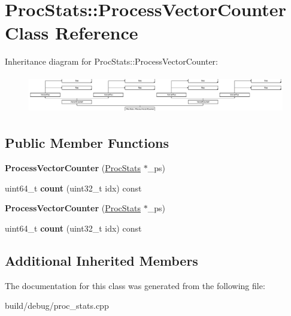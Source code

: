 \hypertarget{classProcStats_1_1ProcessVectorCounter}{\section{Proc\-Stats\-:\-:Process\-Vector\-Counter Class Reference}
\label{classProcStats_1_1ProcessVectorCounter}
}
Inheritance diagram for Proc\-Stats\-:\-:Process\-Vector\-Counter\-:\begin{figure}[H]
\begin{center}
\leavevmode
\includegraphics[height=1.674641cm]{classProcStats_1_1ProcessVectorCounter}
\end{center}
\end{figure}
\subsection*{Public Member Functions}
\begin{DoxyCompactItemize}
\item 
\hypertarget{classProcStats_1_1ProcessVectorCounter_aaa84227ea2ba5b9797c6fd18c3277914}{{\bfseries Process\-Vector\-Counter} (\hyperlink{classProcStats}{Proc\-Stats} $\ast$\-\_\-ps)}\label{classProcStats_1_1ProcessVectorCounter_aaa84227ea2ba5b9797c6fd18c3277914}

\item 
\hypertarget{classProcStats_1_1ProcessVectorCounter_a5b1c76bcf6b6429fec1a4bbf20fdfdf4}{uint64\-\_\-t {\bfseries count} (uint32\-\_\-t idx) const }\label{classProcStats_1_1ProcessVectorCounter_a5b1c76bcf6b6429fec1a4bbf20fdfdf4}

\item 
\hypertarget{classProcStats_1_1ProcessVectorCounter_aaa84227ea2ba5b9797c6fd18c3277914}{{\bfseries Process\-Vector\-Counter} (\hyperlink{classProcStats}{Proc\-Stats} $\ast$\-\_\-ps)}\label{classProcStats_1_1ProcessVectorCounter_aaa84227ea2ba5b9797c6fd18c3277914}

\item 
\hypertarget{classProcStats_1_1ProcessVectorCounter_a5b1c76bcf6b6429fec1a4bbf20fdfdf4}{uint64\-\_\-t {\bfseries count} (uint32\-\_\-t idx) const }\label{classProcStats_1_1ProcessVectorCounter_a5b1c76bcf6b6429fec1a4bbf20fdfdf4}

\end{DoxyCompactItemize}
\subsection*{Additional Inherited Members}


The documentation for this class was generated from the following file\-:\begin{DoxyCompactItemize}
\item 
build/debug/proc\-\_\-stats.\-cpp\end{DoxyCompactItemize}
